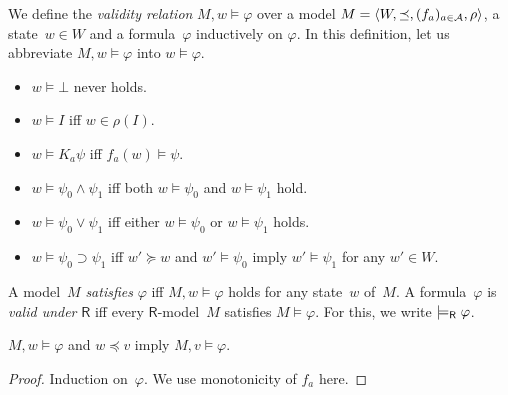   \begin{definition}
   We define the \textit{validity relation} $M,w\models\varphi$ over a model
   $M = \langle{W,\preceq,(f_a)_{a\in \mathcal A},\rho}\rangle$, a state~$w\in W$ and a
   formula~$\varphi$ inductively on $\varphi$.
   In this definition, let
   us abbreviate $M,w\models \varphi$ into $w\models \varphi$\enspace.
   \newcommand{\m}{}
   \begin{itemize}
    \item $w\models \bot$ never holds.
    \item $w\models I$ iff
	  $w \in
	  \rho(I)$.
    \item	    $w\models K_a \psi$ iff
		    $f_a(w)\models \psi$.
    \item $w\models \psi_0\land\psi_1$ iff both
	  $w\models \psi_0$ and $w\models \psi_1$ hold.
    \item
	 $ w\models \psi_0\vee\psi_1$ iff either
	 $ w\models \psi_0$ or $w\models \psi_1$ holds.
    \item
	 $w\models \psi_0\supset\psi_1$ iff
	 $w'\succeq w$ and $w'\models \psi_0$ imply
	 $w'\models\psi_1$ for any $w'\in W$\enspace.
   \end{itemize}
  \end{definition}
  A model~$M$ \textit{satisfies} $\varphi$ iff $M,w\models\varphi$ holds for any
  state~$w$ of~$M$.
  A formula~$\varphi$ is \textit{valid under} $\mathsf R$ iff
  every $\mathsf R$-model~$M$ satisfies $M\models \varphi$.
  For this, we write $\models_{\mathsf R} \varphi$\enspace.

  \begin{lemma}
   \label{monot}
   $M,w\models\varphi$ and $w\preceq v$ imply
   $M,v\models\varphi$.
  \end{lemma}
  \begin{proof}
   Induction on~$\varphi$.
   We use monotonicity of $f_a$ here.
  \end{proof}

